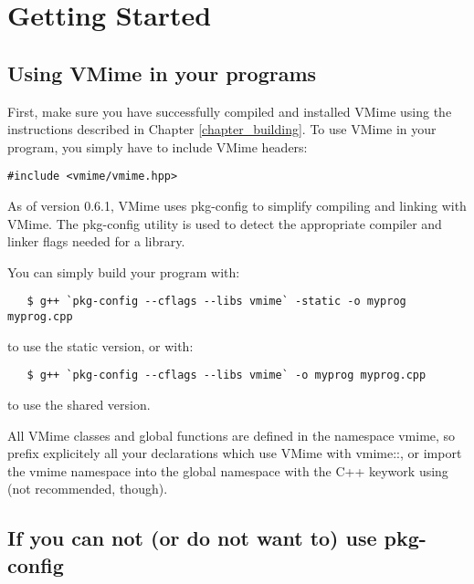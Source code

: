 \chapter{Getting Started}

\section{Using VMime in your programs}

First, make sure you have successfully compiled and installed VMime using the
instructions described in Chapter \ref{chapter_building}. To use VMime in your
program, you simply have to include VMime headers:

\begin{lstlisting}
#include <vmime/vmime.hpp>
\end{lstlisting}


As of version 0.6.1, VMime uses {\vcode pkg-config} to simplify compiling and
linking with VMime. The {\vcode pkg-config} utility is used to detect the
appropriate compiler and linker flags needed for a library.

You can simply build your program with:

\begin{verbatim}
   $ g++ `pkg-config --cflags --libs vmime` -static -o myprog myprog.cpp
\end{verbatim}

to use the static version, or with:

\begin{verbatim}
   $ g++ `pkg-config --cflags --libs vmime` -o myprog myprog.cpp
\end{verbatim}

to use the shared version.


All VMime classes and global functions are defined in the namespace
{\vcode vmime}, so prefix explicitely all your declarations which use VMime
with {\vcode vmime::}, or import the {\vcode vmime} namespace into the global
namespace with the C++ keywork {\vcode using} (not recommended, though).


\section{If you can not (or do not want to) use {\vcode pkg-config}}

